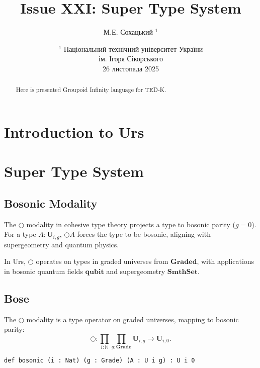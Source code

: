 \documentclass{article}
\begin{document}
\author { М.Е. Сохацький $^1$ }
\title { Issue XXI: Super Type System }
\date{ \small $^1$ Національний технічний університет України \\
       ім. Ігоря Сікорського \\
       26 листопада 2025 }
\maketitle


\begin{abstract}
Here is presented Groupoid Infinity language for TED-K.
\end{abstract}

\ifincludeTOC
  \tableofcontents
\else
\fi

\section{Introduction to Urs}

\section{Super Type System}

\subsection{Bosonic Modality}

The $\bigcirc$ modality in cohesive type theory projects a type to bosonic parity ($g = 0$).
For a type $A : \mathbf{U}_{i,g}$, $\bigcirc A$ forces the type to be bosonic,
aligning with supergeometry and quantum physics.

In Urs, $\bigcirc$ operates on types in graded universes from $\mathbf{Graded}$,
with applications in bosonic quantum fields $\mathbf{qubit}$ and supergeometry
$\mathbf{SmthSet}$.

\subsection{Bose}

\begin{definition}\label{def:bosonic-formation}
The $\bigcirc$ modality is a type operator on graded universes, mapping to bosonic parity:
\[
    \bigcirc : \prod_{i : \mathbb{N}} \prod_{g : \mathbf{Grade}}
    \mathbf{U}_{i,g} \to \mathbf{U}_{i,0}.
\]
\begin{lstlisting}[mathescape=true]
def bosonic (i : Nat) (g : Grade) (A : U i g) : U i 0
\end{lstlisting}
\end{definition}
\end{document}
